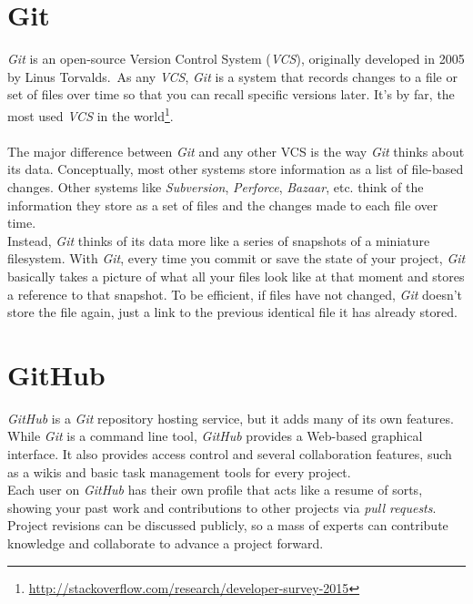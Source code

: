\documentclass[a4paper, 12pt]{book}
\begin{document}
\section{Git}
\label{sec:git}
\emph{Git} is an open-source Version Control System (\emph{VCS}), originally developed in 2005 by Linus Torvalds.\
As any \emph{VCS}, \emph{Git} is a system that records changes to a file or set of files over time
so that you can recall specific versions later.
It's by far, the most used \emph{VCS} in the world\footnote{\url{http://stackoverflow.com/research/developer-survey-2015}}.\\\\
The major difference between \emph{Git} and any other VCS is the way \emph{Git} thinks about its data.
Conceptually, most other systems store information as a list of file-based changes. Other systems like \textit{Subversion},
\textit{Perforce}, \textit{Bazaar}, etc. think of the information they store as a set of files and the changes made to each
file over time.\\
Instead, \emph{Git} thinks of its data more like a series of snapshots of a miniature filesystem.
With \emph{Git}, every time you commit or save the state of your project, \emph{Git} basically takes a picture of what all
your files look like at that moment and stores a reference to that snapshot. To be efficient, if files have not changed,
\emph{Git} doesn't store the file again, just a link to the previous identical file it has already stored.
\section{GitHub}
\label{sec:github}
\emph{GitHub} is a \emph{Git} repository hosting service, but it adds many of its own features. While \emph{Git} is a command
line tool, \emph{GitHub} provides a Web-based graphical interface. It also provides access control and several collaboration features,
such as a wikis and basic task management tools for every project.\\
Each user on \emph{GitHub} has their own profile that acts like a resume of sorts, showing your past work and contributions to
other projects via \textit{pull requests}. Project revisions can be discussed publicly, so a mass of experts can contribute knowledge
and collaborate to advance a project forward.
\end{document}
